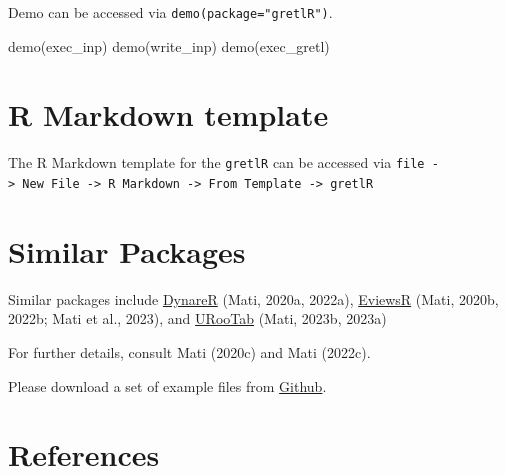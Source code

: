 \documentclass[
  letterpaper,
  DIV=11,
  numbers=noendperiod]{scrartcl}
\newenvironment{Shaded}{\begin{snugshade}}{\end{snugshade}}
\newcommand{\FunctionTok}[1]{\textcolor[rgb]{0.28,0.35,0.67}{#1}}
\newcommand{\NormalTok}[1]{\textcolor[rgb]{0.00,0.23,0.31}{#1}}
\begin{document}
Demo can be accessed via \texttt{demo(package="gretlR")}.

\begin{Shaded}
\begin{Highlighting}[]
\FunctionTok{demo}\NormalTok{(exec\_inp) }
\FunctionTok{demo}\NormalTok{(write\_inp)}
\FunctionTok{demo}\NormalTok{(exec\_gretl)}
\end{Highlighting}
\end{Shaded}

\hypertarget{r-markdown-template}{%
\section{R Markdown template}\label{r-markdown-template}}

The R Markdown template for the \texttt{gretlR} can be accessed via
\texttt{file\ -\textgreater{}\ New\ File\ -\textgreater{}\ R\ Markdown\ -\textgreater{}\ From\ Template\ -\textgreater{}\ gretlR}

\hypertarget{similar-packages}{%
\section{Similar Packages}\label{similar-packages}}

Similar packages include
\href{https://github.com/sagirumati/DynareR}{DynareR} (Mati, 2020a,
2022a), \href{https://github.com/sagirumati/gretlR}{EviewsR} (Mati,
2020b, 2022b; Mati et al., 2023), and
\href{https://github.com/sagirumati/URooTab}{URooTab} (Mati, 2023b,
2023a)

For further details, consult Mati (2020c) and Mati (2022c).

Please download a set of example files from
\href{https://github.com/sagirumati/gretlR/tree/master/inst/examples/}{Github}.

\hypertarget{references}{%
\section*{References}\label{references}}
\end{document}
